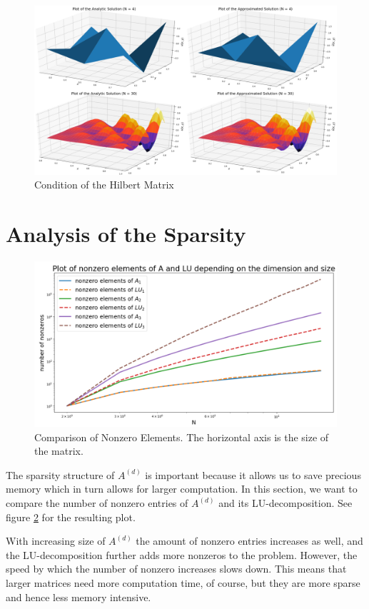 \documentclass[refman]{article}
\theoremstyle{definition}
\begin{document}
\begin{figure}[h]
	\includegraphics[width=\linewidth]{graphics/plot.jpg}
	\caption{Condition of the Hilbert Matrix}
	\label{fig:plots}
\end{figure}
\bigskip

\section{Analysis of the Sparsity}

\begin{figure}[h]
	\includegraphics[width=\linewidth]{graphics/sparsity.png}
	\caption{Comparison of Nonzero Elements. The horizontal axis is the size of the matrix.}
	\label{fig:boat1}
\end{figure}

The sparsity structure of \(A^{(d)}\) is important because it allows us to save precious memory which in turn allows for larger computation. In this section, we want to compare the number of nonzero entries of \(A^{(d)}\) and its LU-decomposition. See figure \ref{fig:boat1} for the resulting plot.

With increasing size of \(A^{(d)}\) the amount of nonzero entries increases as well, and the LU-decomposition further adds more nonzeros to the problem. However, the speed by which the number of nonzero increases slows down. This means that larger matrices need more computation time, of course, but they are more sparse and hence less memory intensive.
\end{document}
